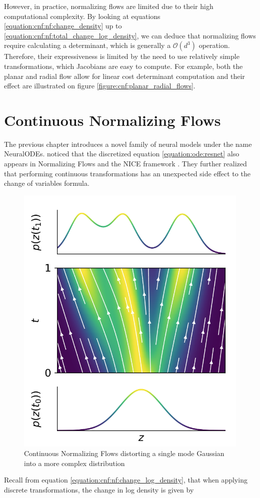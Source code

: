 However, in practice, normalizing flows are limited due to their high computational complexity. By looking at equations \ref{equation:cnf:nf:change_density} up to \ref{equation:cnf:nf:total_change_log_density}, we can deduce that normalizing flows require calculating a determinant, which is generally a $ \mathcal{O}(d^3) $ operation. Therefore, their expressiveness is limited by the need to use relatively simple transformations, which Jacobians are easy to compute. For example, both the planar and radial flow allow for linear cost determinant computation and their effect are illustrated on figure \ref{figure:cnf:planar_radial_flows}.

\section{Continuous Normalizing Flows}
\label{section:cnf:cnf}

The previous chapter introduces a novel family of neural models under the name NeuralODEs. \citet{chen2018neural} noticed that the discretized equation \ref{equation:ode:resnet} also appears in Normalizing Flows \citep{rezende2015variational} and the NICE framework \citep{dinh2014nice}. They further realized that performing continuous transformations has an unexpected side effect to the change of variables formula.

\begin{figure}[ht]
      \centering
      \includegraphics[width=0.5\columnwidth]{figures/cnf_transformations.png}
      \caption{Continuous Normalizing Flows distorting a single mode Gaussian into a more complex distribution \citep{grathwohl2018ffjord}}
      \label{figure:cnf:cnf_transformations}
\end{figure}

Recall from equation \ref{equation:cnf:nf:change_log_density}, that when applying discrete transformations, the change in log density is given by

